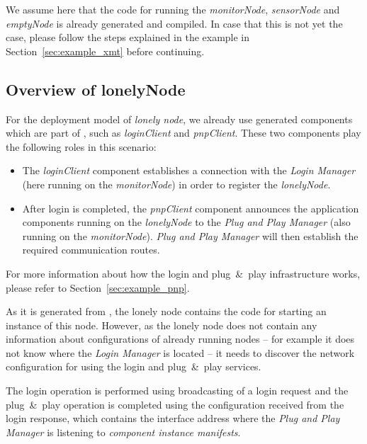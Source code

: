 We assume here that the code for running the \emph{monitorNode}, \emph{sensorNode} and \emph{emptyNode} is already generated and compiled.
In case that this is not yet the case, please follow the steps explained in the example in Section~\ref{sec:example_xmt} before continuing.

\subsection{Overview of lonelyNode}

For the deployment model of \emph{lonely node}, we already use generated components which are part of \xmt, such as \emph{loginClient} and \emph{pnpClient}.
These two components play the following roles in this scenario:

\begin{itemize}
	\item The \emph{loginClient} component establishes a connection with the \emph{Login Manager}
		(here running on the \emph{monitorNode}) in order to register the \emph{lonelyNode}.
	
	\item After login is completed, the \emph{pnpClient} component announces the application components
		running on the \emph{lonelyNode} to the \emph{Plug and Play Manager} (also running on the \emph{monitorNode}).
		\emph{Plug and Play Manager} will then establish the required communication routes.
\end{itemize}
%
For more information about how the login and plug~\&~play infrastructure works, please refer to Section~\ref{sec:example_pnp}.

As it is generated from \xmt, the lonely node contains the code for starting an \xme instance of this node.
However, as the lonely node does not contain any information about configurations of already running nodes --
for example it does not know where the \emph{Login Manager} is located --
it needs to discover the network configuration for using the login and plug~\&~play services.

The login operation is performed using broadcasting of a login request and the plug~\&~play operation is completed using the configuration
received from the login response, which contains the interface address where the \emph{Plug and Play Manager} is listening to \emph{component instance manifests}.

